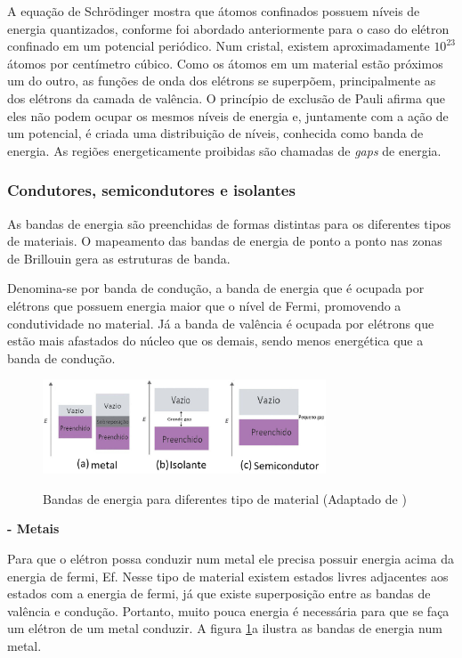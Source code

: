 \par A equação de Schrödinger mostra que átomos confinados possuem níveis de energia quantizados, conforme foi abordado anteriormente para o caso do elétron confinado em um potencial periódico. Num cristal, existem aproximadamente $10^{23}$ átomos por centímetro cúbico. Como os átomos em um material estão próximos um do outro, as funções de onda dos elétrons se superpõem, principalmente as dos elétrons da camada de valência. O princípio de exclusão de Pauli afirma que eles não podem ocupar os mesmos níveis de energia e, juntamente com a ação de um potencial, é criada uma distribuição de níveis, conhecida como banda de energia. As regiões energeticamente proibidas são chamadas de \textit{gaps} de energia\cite{qm_fis6}.

\subsubsection{Condutores, semicondutores e isolantes}

	\par As bandas de energia\cite{qm_fis6} são preenchidas de formas distintas para os diferentes tipos de materiais. O mapeamento das bandas de energia de ponto a ponto nas zonas de Brillouin gera as estruturas de banda.

	\par Denomina-se por banda de condução, a banda de energia que é ocupada por elétrons que possuem energia maior que o nível de Fermi, promovendo a condutividade no material. Já a banda de valência é ocupada por elétrons que estão mais afastados do núcleo que os demais, sendo menos energética que a banda de condução.

	\begin{figure}[H]
      \caption{Bandas de energia para diferentes tipo de material (Adaptado de \cite{bulk1})}
      \centering
      \includegraphics[width=0.75\textwidth]{images/figura3.jpg}
      \label{fig3}
    \end{figure}

	\par \textbf{- Metais}
	
		\par Para que o elétron possa conduzir num metal ele precisa possuir energia acima da energia de fermi, Ef. Nesse tipo de material existem estados livres adjacentes aos estados com a energia de fermi, já que existe superposição entre as bandas de valência e condução. Portanto, muito pouca energia é necessária para que se faça um elétron de um metal conduzir. A figura \ref{fig3}a ilustra as bandas de energia num metal. 

